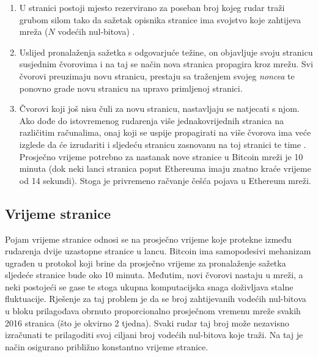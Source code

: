 \documentclass[utf8, zavrsni]{fer}
\begin{document}
\begin{enumerate}
	\item U stranici postoji mjesto rezervirano za poseban broj kojeg rudar traži grubom silom tako da sažetak opisnika stranice ima svojstvo koje zahtijeva mreža ($N$ vodećih nul-bitova) \footnotemark.
	
	\item Uslijed pronalaženja sažetka s odgovarjuće težine, on objavljuje svoju stranicu susjednim čvorovima i na taj se način nova stranica propagira kroz mrežu. Svi čvorovi preuzimaju novu stranicu, prestaju sa traženjem svojeg \textit{noncea} te ponovno grade novu stranicu na upravo primljenoj stranici.
	\item Čvorovi koji još nisu čuli za novu stranicu, nastavljaju se natjecati s njom. Ako dođe do istovremenog rudarenja više jednakovrijednih stranica na različitim računalima, onaj koji se uspije propagirati na više čvorova ima veće izglede da će izrudariti i sljedeću stranicu zasnovanu na toj stranici te time  \footnotemark {}
	\footnotemark.
	Prosječno vrijeme potrebno za nastanak nove stranice u Bitcoin mreži je 10 minuta (dok neki lanci stranica poput Ethereuma imaju znatno kraće vrijeme od 14 sekundi). Stoga je privremeno račvanje češća pojava u Ethereum mreži.
\end{enumerate}

\subsection{Vrijeme stranice}
Pojam vrijeme stranice odnosi se na prosječno vrijeme koje protekne između rudarenja dvije uzastopne stranice u lancu. Bitcoin ima samopodesivi mehanizam ugrađen u protokol koji brine da prosječno vrijeme za pronalaženje sažetka sljedeće stranice bude oko 10 minuta. Međutim, novi čvorovi nastaju u mreži, a neki postojeći se gase te stoga ukupna komputacijska snaga doživljava stalne fluktuacije. Rješenje za taj problem je da se broj zahtijevanih vodećih nul-bitova u bloku prilagođava obrnuto proporcionalno prosječnom vremenu mreže svakih 2016 stranica (što je okvirno 2 tjedna). Svaki rudar taj broj može nezavisno izračunati te prilagoditi svoj ciljani broj vodećih nul-bitova koje traži. Na taj je način osigurano približno konstantno vrijeme stranice.
\end{document}
